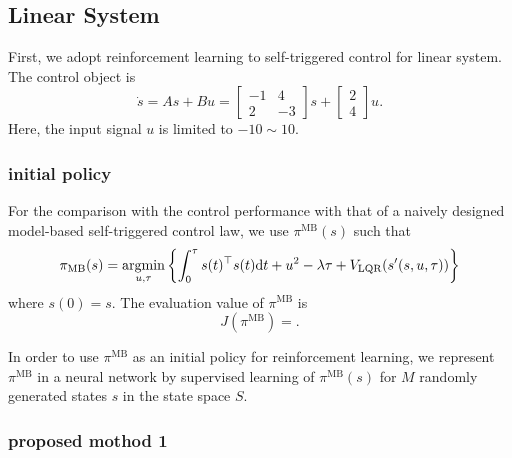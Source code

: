 \documentclass[english, dvipdfmx]{ampmt}             %
\newcommand{\argmin}{\mathop{\rm argmin}\limits}
\begin{document}
\subsection{Linear System}
First, we adopt reinforcement learning to self-triggered control for linear system. The control object is
\begin{equation}
	\dot{s} = As + Bu = \begin{bmatrix}-1& 4 \\ 2 & -3\end{bmatrix}s + \begin{bmatrix}2 \\ 4\end{bmatrix}u.
\end{equation}
Here, the input signal $u$ is limited to $-10 \sim 10$.


\subsubsection{initial policy}
For the comparison with the control performance with that of a naively designed model-based self-triggered control law, we use $\pi^{\textrm{MB}}(s)$ such that
\begin{equation}
	\pi_{\textrm{MB}}(s) = \argmin_{u,\tau} \left\{\int_{0}^{\tau} s(t)^{\top}s(t)\textrm{d}t + u^2 - \lambda\tau + V_{\textrm{LQR}}(s^{\prime}(s,u,\tau))\right\}
\end{equation}
where $s(0) = s$. The evaluation value of $\pi^{\textrm{MB}}$ is
\begin{equation}
	J(\pi^{\textrm{MB}}) = .
\end{equation}\par
In order to use $\pi^{\textrm{MB}}$ as an initial policy for reinforcement learning, we represent $\pi^{\textrm{MB}}$ in a neural network by supervised learning of $\pi^{\textrm{MB}}(s)$ for  $M$ randomly generated states $s$ in the state space $S$.

\subsubsection{proposed mothod 1}
\end{document}

